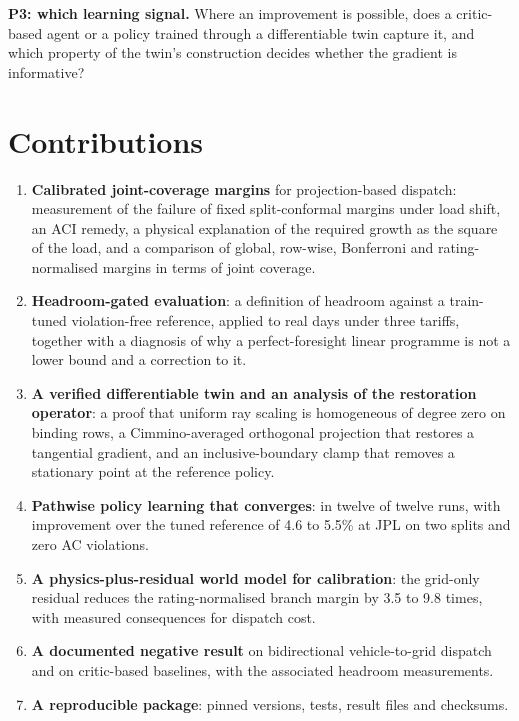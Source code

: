 \documentclass[11pt]{article}
\begin{document}
\textbf{P3: which learning signal.} Where an improvement is possible, does a critic-based agent or a policy trained through a differentiable twin capture it, and which property of the twin's construction decides whether the gradient is informative?

\section{Contributions}\label{sec:contrib}
\begin{enumerate}
\item \textbf{Calibrated joint-coverage margins} for projection-based dispatch: measurement of the failure of fixed split-conformal margins under load shift, an ACI remedy, a physical explanation of the required growth as the square of the load, and a comparison of global, row-wise, Bonferroni and rating-normalised margins in terms of joint coverage.
\item \textbf{Headroom-gated evaluation}: a definition of headroom against a train-tuned violation-free reference, applied to real days under three tariffs, together with a diagnosis of why a perfect-foresight linear programme is not a lower bound and a correction to it.
\item \textbf{A verified differentiable twin and an analysis of the restoration operator}: a proof that uniform ray scaling is homogeneous of degree zero on binding rows, a Cimmino-averaged orthogonal projection that restores a tangential gradient, and an inclusive-boundary clamp that removes a stationary point at the reference policy.
\item \textbf{Pathwise policy learning that converges}: in twelve of twelve runs, with improvement over the tuned reference of 4.6 to 5.5\% at JPL on two splits and zero AC violations.
\item \textbf{A physics-plus-residual world model for calibration}: the grid-only residual reduces the rating-normalised branch margin by 3.5 to 9.8 times, with measured consequences for dispatch cost.
\item \textbf{A documented negative result} on bidirectional vehicle-to-grid dispatch and on critic-based baselines, with the associated headroom measurements.
\item \textbf{A reproducible package}: pinned versions, tests, result files and checksums.
\end{enumerate}
\end{document}
